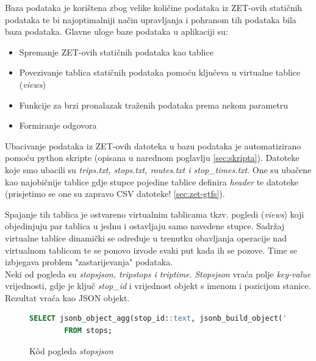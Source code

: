 \documentclass[zavrsnirad]{fer}
\begin{document}
Baza podataka je korištena zbog velike količine podataka iz ZET-ovih statičnih podataka te bi najoptimalniji način upravljanja i pohranom tih podataka bila baza podataka.
Glavne uloge baze podataka u aplikaciji su:
\begin{itemize}
	\item Spremanje ZET-ovih statičnih podataka kao tablice
 	\item Povezivanje tablica statičnih podataka pomoću ključeva u virtualne tablice (\textit{views})
 	\item Funkcije za brzi pronalazak traženih podataka prema nekom parametru
 	\item Formiranje odgovora
\end{itemize}

Ubacivanje podataka iz ZET-ovih datoteka u bazu podataka je automatizirano pomoću python skripte (opisana u narednom poglavlju \ref{sec:skripta}). Datoteke koje smo ubacili su \textit{trips.txt, stops.txt, routes.txt i stop\_times.txt}. One su ubačene kao najobičnije tablice gdje stupce pojedine tablice definira \textit{header} te datoteke (prisjetimo se one su zapravo CSV datoteke! \ref{sec:zet-gtfs}).

Spajanje tih tablica je ostvareno virtualnim tablicama tkzv. pogledi (\textit{views}) koji objedinjuju par tablica u jednu i ostavljaju samo navedene stupce. Sadržaj virtualne tablice dinamički se određuje u trenutku obavljanja operacije nad virtualnom tablicom te se ponovo izvode svaki put kada ih se pozove. Time se izbjegava problem "zastarijevanja" podataka.\\
Neki od pogleda su \textit{stopsjson, tripstops i triptime}.
\textit{Stopsjson} vraća polje \textit{key-value} vrijednosti, gdje je ključ \textit{stop\_id} i vrijednost objekt s imenom i pozicijom stanice. Rezultat vraća kao JSON objekt.
\begin{figure}[h]
	\centering
	\begin{minipage}{0.8\linewidth}
		\begin{lstlisting}[language=SQL]
 		SELECT jsonb_object_agg(stop_id::text, jsonb_build_object('stop_name', stop_name, 'stop_lat', stop_lat, 'stop_lon', stop_lon)) AS stops
		FROM stops;
		\end{lstlisting}
	\end{minipage}
	\caption{K\^od pogleda \textit{stopsjson}}
	\label{slk:stopsjson}
\end{figure}
\end{document}
